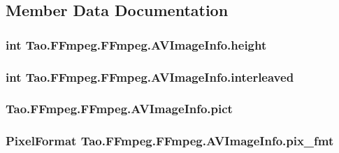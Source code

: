 \subsection{Member Data Documentation}
\hypertarget{struct_tao_1_1_f_fmpeg_1_1_f_fmpeg_1_1_a_v_image_info_aeeb828a15f199f09a5bd874dd7f1b12f}{
\subsubsection[{height}]{\setlength{\rightskip}{0pt plus 5cm}int {\bf Tao.FFmpeg.FFmpeg.AVImageInfo.height}}}
\label{struct_tao_1_1_f_fmpeg_1_1_f_fmpeg_1_1_a_v_image_info_aeeb828a15f199f09a5bd874dd7f1b12f}
\hypertarget{struct_tao_1_1_f_fmpeg_1_1_f_fmpeg_1_1_a_v_image_info_aada9b9f5eee9d586fadeff4b0938fd2f}{
\subsubsection[{interleaved}]{\setlength{\rightskip}{0pt plus 5cm}int {\bf Tao.FFmpeg.FFmpeg.AVImageInfo.interleaved}}}
\label{struct_tao_1_1_f_fmpeg_1_1_f_fmpeg_1_1_a_v_image_info_aada9b9f5eee9d586fadeff4b0938fd2f}
\hypertarget{struct_tao_1_1_f_fmpeg_1_1_f_fmpeg_1_1_a_v_image_info_aeb9032217fd4d494688db378225a3acc}{
\subsubsection[{pict}]{ {\bf Tao.FFmpeg.FFmpeg.AVImageInfo.pict}}}
\label{struct_tao_1_1_f_fmpeg_1_1_f_fmpeg_1_1_a_v_image_info_aeb9032217fd4d494688db378225a3acc}
\hypertarget{struct_tao_1_1_f_fmpeg_1_1_f_fmpeg_1_1_a_v_image_info_a5d35754aa35464fcb3a2b2ccbb8c4399}{
\subsubsection[{pix\_\-fmt}]{\setlength{\rightskip}{0pt plus 5cm}PixelFormat {\bf Tao.FFmpeg.FFmpeg.AVImageInfo.pix\_\-fmt}}}
